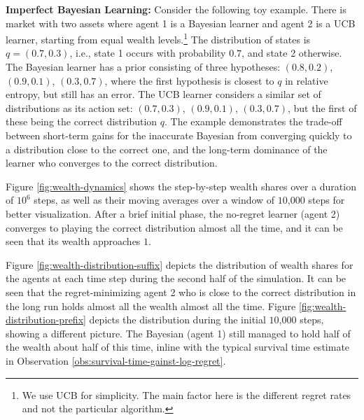 \textbf{Imperfect Bayesian Learning:}
Consider the following toy example. There is market with two assets where agent 1 is a Bayesian learner and agent 2 is a UCB learner, starting from equal wealth levels.\footnote{We use UCB for simplicity. The main factor here is the different regret rates and not the particular algorithm.} The distribution of states is $q = (0.7, 0.3)$, i.e., state 1 occurs with probability $0.7$, and state 2 otherwise. The Bayesian learner has a prior consisting of three hypotheses: $(0.8, 0.2)$, $(0.9, 0.1)$, $(0.3, 0.7)$, where the first hypothesis is closest to $q$ in relative entropy, but still has an error. The UCB learner considers a similar set of distributions as its action set: $(0.7, 0.3)$, $(0.9, 0.1)$, $(0.3, 0.7)$, but the first of these being the correct distribution $q$. 
The example demonstrates the trade-off between short-term gains for the inaccurate Bayesian from converging quickly to a distribution close to the correct one, and the long-term dominance of the learner who converges to the correct distribution. 

Figure \ref{fig:wealth-dynamics} shows the step-by-step wealth shares over a duration of $10^6$ steps, as well as their moving averages over a window of $10$,$000$ steps for better visualization. After a brief initial phase, the no-regret learner (agent 2) converges to playing the correct distribution almost all the time, and it can be seen that its wealth approaches $1$.  

Figure \ref{fig:wealth-distribution-suffix} depicts the distribution of wealth shares for the agents at each time step during the second half of the simulation. It can be seen that the regret-minimizing agent 2 who is close to the correct distribution in the long run holds almost all the wealth almost all the time. 
Figure \ref{fig:wealth-distribution-prefix} depicts the distribution during the initial $10$,$000$ steps, showing a different picture. The Bayesian (agent 1) still managed to hold half of the wealth about half of this time, inline with the typical survival time estimate in Observation \ref{obs:survival-time-gainst-log-regret}.  


